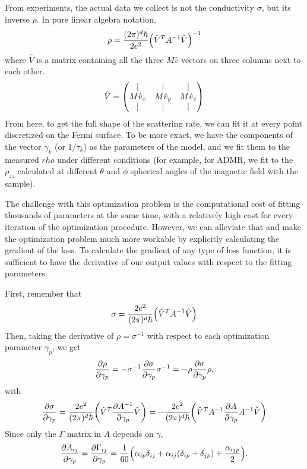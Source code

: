 \documentclass[12pt]{article}
\begin{document}
From experiments, the actual data we collect is not the conductivity $\sigma$, but its inverse $\rho$. In pure linear algebra notation,
\begin{equation}
    \rho = \frac{(2\pi)^d\hbar}{2e^2}\qty(\hat{V}^TA^{-1}\hat{V})^{-1}
\end{equation}
where $\hat{V}$ is a matrix containing all the three $M\hat{v}$ vectors on three columns next to each other. 
\begin{equation}
    \hat{V} = \mqty(\vert&\vert&\vert\\M\hat{v}_x&M\hat{v}_y&M\hat{v}_z\\\vert&\vert&\vert)
\end{equation}
From here, to get the full shape of the scattering rate, we can fit it at every point discretized on the Fermi surface. To be more exact, we have the components of the vector $\gamma_k$ (or $1/\tau_k$) as the parameters of the model, and we fit them to the measured $rho$ under different conditions (for example, for ADMR, we fit to the $\rho_{zz}$ calculated at different $\theta$ and $\phi$ spherical angles of the magnetic field with the sample).

The challenge with this optimization problem is the computational cost of fitting thousands of parameters at the same time, with a relatively high cost for every iteration of the optimization procedure. However, we can alleviate that and make the optimization problem much more workable by explicitly calculating the gradient of the loss. To calculate the gradient of any type of loss function, it is sufficient to have the derivative of our output values with respect to the fitting parameters.

First, remember that
\begin{equation}
     \sigma = \frac{2e^2}{(2\pi)^d\hbar}\qty(\hat{V}^TA^{-1}\hat{V})
\end{equation}
Then, taking the derivative of $\rho=\sigma^{-1}$ with respect to each optimization parameter $\gamma_p$, we get
\begin{equation}
    \pdv{\rho}{\gamma_p} = -\sigma^{-1}\pdv{\sigma}{\gamma_p}\sigma^{-1} = -\rho\pdv{\sigma}{\gamma_p}\rho,
\end{equation}
with
\begin{equation}
\pdv{\sigma}{\gamma_p} = \frac{2e^2}{(2\pi)^d\hbar}\qty(\hat{V}^T\pdv{A^{-1}}{\gamma_p}\hat{V})
= -\frac{2e^2}{(2\pi)^d\hbar}\qty(\hat{V}^TA^{-1}\pdv{A}{\gamma_p}A^{-1}\hat{V})
\label{eq:inv_sigma}
\end{equation}
Since only the $\Gamma$ matrix in $A$ depends on $\gamma$,
\begin{equation}
    \pdv{A_{ij}}{\gamma_p} = \pdv{\Gamma_{ij}}{\gamma_p}
    = \frac{1}{60}\qty(\alpha_{ip}\delta_{ij}
    +\alpha_{ij}\qty(\delta_{ip}+\delta_{jp})
    +\frac{\alpha_{ijp}}{2}).
    \label{eq:gamma_dv}
\end{equation}
\end{document}
